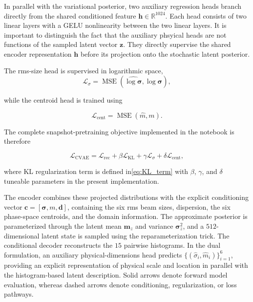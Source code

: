 In parallel with the variational posterior, two auxiliary regression heads branch directly from the shared conditioned feature $\mathbf{h}\in\mathbb{R}^{1024}$. Each head consists of two linear layers with a GELU nonlinearity between the two linear layers. It is important to distinguish the fact that the auxiliary phsyical heads are not functions of the sampled latent vector $\mathbf{z}$. They directly supervise the shared encoder representation $\mathbf{h}$ before its projection onto the stochastic latent posterior.

   
The rms-size head is supervised in logarithmic space,
\begin{equation}
    \mathcal{L}_{\sigma}
    =
    \operatorname{MSE}
    \left(
        \widehat{\log\boldsymbol{\sigma}},
        \log\boldsymbol{\sigma}
    \right),
\end{equation}

while the centroid head is trained using

\begin{equation}
     \mathcal{L}_{\mathrm{cent}}
    =
    \operatorname{MSE}
    \left(
        \widehat{m},
        m
    \right).
\end{equation}

The complete snapshot-pretraining objective implemented in the notebook is therefore

\begin{equation}
    \mathcal{L}_{\mathrm{CVAE}}
    =
    \mathcal{L}_{\mathrm{rec}}
    +
    \beta
    \mathcal{L}_{\mathrm{KL}}
    +
    \gamma
    \mathcal{L}_{\sigma}
    +
    \delta
    \mathcal{L}_{\mathrm{cent}},
\end{equation}

where KL regularization term is defined in\eqref{eq:KL_term} with $\beta$, $\gamma$, and $\delta$ tuneable parameters in the present implementation.



The encoder combines these projected distributions with the explicit conditioning vector $\mathbf{c}= [\boldsymbol{\sigma}, m, \mathbf{d}]$, containing the six rms beam sizes, dispersion, the six phase-space centroids, and the domain information. The approximate posterior is parameterized through the latent mean $\boldsymbol{m}_{z}$ and variance $\boldsymbol{\sigma}_{z}^{2}$, and a $512$-dimensional latent state is sampled using the reparameterization trick. The conditional decoder reconstructs the $15$ pairwise histograms. In the dual formulation, an auxiliary physical-dimensions head predicts $\{(\widehat{\sigma}_{i},\widehat{m}_{i})\}_{i=1}^{6}$, providing an explicit representation of physical scale and location in parallel with the histogram-based latent description. Solid arrows denote forward model evaluation, whereas dashed arrows denote conditioning, regularization, or loss pathways.

